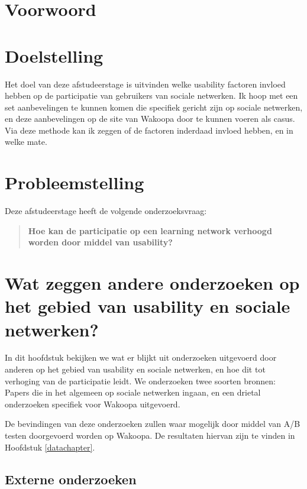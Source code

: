 \documentclass[a4paper, 10pt, pdftex]{report}
\begin{document}
  \newpage
  \chapter*{Voorwoord}

  \newpage
  \chapter*{Doelstelling}
    Het doel van deze afstudeerstage is uitvinden welke usability factoren invloed hebben op de participatie van gebruikers van sociale netwerken. Ik hoop met een set aanbevelingen te kunnen komen die specifiek gericht zijn op sociale netwerken, en deze aanbevelingen op de site van Wakoopa door te kunnen voeren als casus. Via deze methode kan ik zeggen of de factoren inderdaad invloed hebben, en in welke mate.

  \chapter*{Probleemstelling}
    Deze afstudeerstage heeft de volgende onderzoeksvraag:
    \begin{quotation}
     \textbf{Hoe kan de participatie op een learning network verhoogd worden door middel van usability?}
    \end{quotation}

  \newpage
  \chapter{Wat zeggen andere onderzoeken op het gebied van usability en sociale netwerken?}
    \label{researchchapter}
    \newpage

    In dit hoofdstuk bekijken we wat er blijkt uit onderzoeken uitgevoerd door anderen op het gebied van usability en sociale netwerken, en hoe dit tot verhoging van de participatie leidt. We onderzoeken twee soorten bronnen: Papers die in het algemeen op sociale netwerken ingaan, en een drietal onderzoeken specifiek voor Wakoopa uitgevoerd.

      De bevindingen van deze onderzoeken zullen waar mogelijk door middel van A/B testen doorgevoerd worden op Wakoopa. De resultaten hiervan zijn te vinden in Hoofdstuk \ref{datachapter}.

    \section{Externe onderzoeken}
\end{document}
